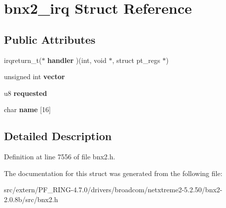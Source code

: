 \hypertarget{structbnx2__irq}{
\section{bnx2\_\-irq Struct Reference}
\label{structbnx2__irq}
}
\subsection*{Public Attributes}
\begin{DoxyCompactItemize}
\item 
\hypertarget{structbnx2__irq_a8be5fbf3fbb7c82bc6f06f8194bc7730}{
irqreturn\_\-t($\ast$ {\bfseries handler} )(int, void $\ast$, struct pt\_\-regs $\ast$)}
\label{structbnx2__irq_a8be5fbf3fbb7c82bc6f06f8194bc7730}

\item 
\hypertarget{structbnx2__irq_af33cbc253dd8ab6a2863cc069d739583}{
unsigned int {\bfseries vector}}
\label{structbnx2__irq_af33cbc253dd8ab6a2863cc069d739583}

\item 
\hypertarget{structbnx2__irq_a72593bea60283067500201bcfbbf408c}{
u8 {\bfseries requested}}
\label{structbnx2__irq_a72593bea60283067500201bcfbbf408c}

\item 
\hypertarget{structbnx2__irq_af8f657a1e3f482702d5c32a32d567c85}{
char {\bfseries name} \mbox{[}16\mbox{]}}
\label{structbnx2__irq_af8f657a1e3f482702d5c32a32d567c85}

\end{DoxyCompactItemize}


\subsection{Detailed Description}


Definition at line 7556 of file bnx2.h.



The documentation for this struct was generated from the following file:\begin{DoxyCompactItemize}
\item 
src/extern/PF\_\-RING-\/4.7.0/drivers/broadcom/netxtreme2-\/5.2.50/bnx2-\/2.0.8b/src/bnx2.h\end{DoxyCompactItemize}
